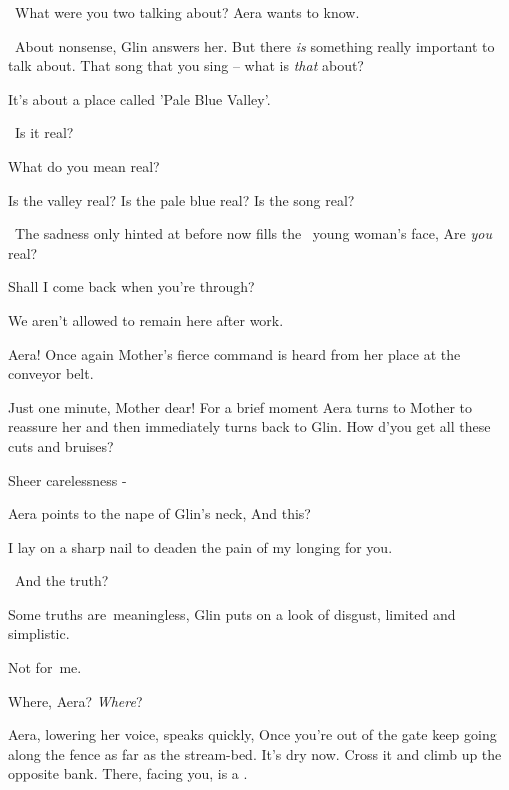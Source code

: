 \documentclass[12pt]{book}
\begin{document}
{\ }{\textquotedbl}What were you two talking about?{\textquotedbl} Aera wants to know.

~{\textquotedbl}About nonsense,{\textquotedbl} Glin answers her. {\textquotedbl}But there \textit{is} something really
important to talk about. That song that you sing -- what is \textit{that} about?{\textquotedbl}

{\textquotedbl}It's about a place called 'Pale Blue Valley'.{\textquotedbl}

~{\textquotedbl}Is it real?{\textquotedbl}

{\textquotedbl}What do you mean real?{\textquotedbl}

{\textquotedbl}Is the valley real? Is the pale blue real? Is the song real?{\textquotedbl}

~The sadness only hinted at before now fills the \ young woman's face, {\textquotedbl}Are \textit{you}
real?{\textquotedbl}

{\textquotedbl}Shall I come back when you're through?{\textquotedbl}

{\textquotedbl}We aren't allowed to remain here after work.{\textquotedbl}

{\textquotedbl}Aera!{\textquotedbl} Once again Mother's fierce command is heard from her place at the conveyor belt.

{\textquotedbl}Just one minute, Mother dear!{\textquotedbl} For a brief moment\MakeUppercase{ a}era turns to Mother to
reassure her and then immediately turns back to Glin. {\textquotedbl}How d'you get all these cuts and
bruises?{\textquotedbl}

{\textquotedbl}Sheer carelessness -{\textquotedbl}

Aera points to the nape of Glin's neck, {\textquotedbl}And this?{\textquotedbl}

{\textquotedbl}I lay on a sharp nail to deaden the pain of my longing for you.{\textquotedbl}

~{\textquotedbl}And the truth?{\textquotedbl}

{\textquotedbl}Some truths are~meaningless,{\textquotedbl} Glin puts on a look of disgust, {\textquotedbl}limited and
simplistic.{\textquotedbl}

{\textquotedbl}Not for~me.{\textquotedbl}~

{\textquotedbl}Where, Aera? \textit{Where}?{\textquotedbl}

Aera, lowering her voice, speaks quickly, {\textquotedbl}Once you're out of the gate keep going along the fence as far
as the stream-bed. It's dry now. Cross it and climb up the opposite bank. There, facing you, is a .{\textquotedbl}
\end{document}
